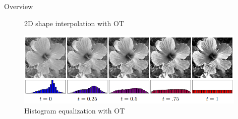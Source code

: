 \begin{frame}{Overview}
\begin{figure}
\begin{minipage}[t]{0.38\linewidth}
            \caption{2D shape interpolation with OT}
            \includegraphics[width=0.98\textwidth]{png/HistogramEqualization.png}
            \caption{Histogram equalization with OT}
        \end{minipage}
    \end{figure}
\end{frame}